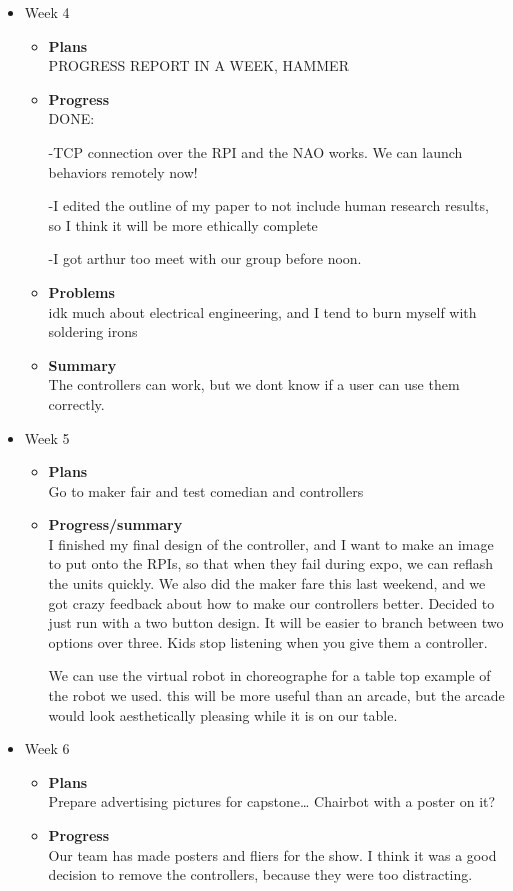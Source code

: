 \begin{itemize}
		\item{Week 4}
			\begin{itemize}
				\item \textbf{Plans} \\
					PROGRESS REPORT IN A WEEK, HAMMER 
				\item \textbf{Progress} \\
						DONE: 

						-TCP connection over the RPI and the NAO works. We can launch behaviors remotely now! 

						-I edited the outline of my paper to not include human research results, so I think it will be more ethically complete 

							-I got arthur too meet with our group before noon. 
				\item \textbf{Problems} \\
					idk much about electrical engineering, and I tend to burn myself with soldering irons
				\item \textbf{Summary} \\
					The controllers can work, but we dont know if a user can use them correctly.
			\end{itemize}

		\item{Week 5}
			\begin{itemize}
				\item \textbf{Plans} \\
					Go to maker fair and test comedian and controllers
				\item \textbf{Progress/summary} \\
 I finished my final design of the controller, and I want to make an image to put onto the RPIs, so that when they fail during expo, we can reflash the units quickly. We also did the maker fare this last weekend, and we got crazy feedback about how to make our controllers better. Decided to just run with a two button design. It will be easier to branch between two options over three. Kids stop listening when you give them a controller. 

We can use the virtual robot in choreographe for a table top example of the robot we used. this will be more useful than an arcade, but the arcade would look aesthetically pleasing while it is on our table. 
			\end{itemize}

		\item{Week 6}
			\begin{itemize}
				\item \textbf{Plans} \\
					Prepare advertising pictures for capstone… Chairbot with a poster on it? 
				\item \textbf{Progress} \\
					Our team has made posters and fliers for the show. I think it was a good decision to remove the controllers, because they were too distracting. 


\end{itemize}
\end{itemize}
